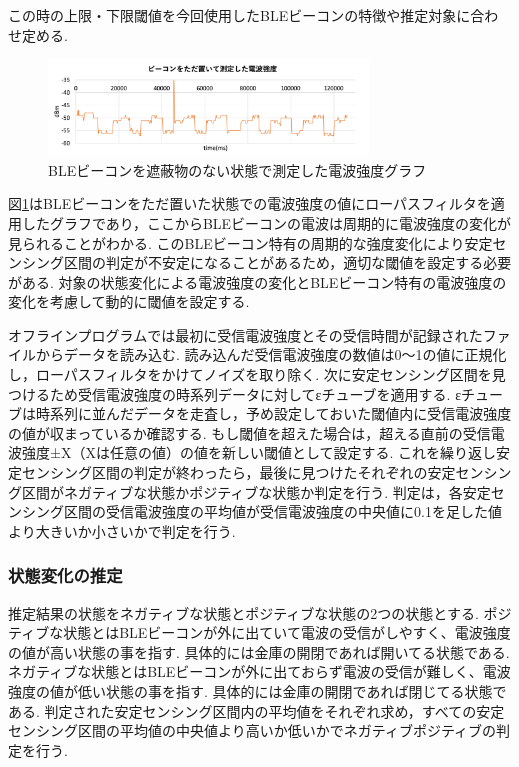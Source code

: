\documentclass[Japanese]{dicomopapers}
\begin{document}
この時の上限・下限閾値を今回使用したBLEビーコンの特徴や推定対象に合わせ定める.

\begin{figure}[b]
    \centering
    \includegraphics[width=8.5cm]{bokoboko.png}
    \caption{BLEビーコンを遮蔽物のない状態で測定した電波強度グラフ}
    \label{nomal-data}
\end{figure}

図\ref{nomal-data}はBLEビーコンをただ置いた状態での電波強度の値にローパスフィルタを適用したグラフであり，ここからBLEビーコンの電波は周期的に電波強度の変化が見られることがわかる.
このBLEビーコン特有の周期的な強度変化により安定センシング区間の判定が不安定になることがあるため，適切な閾値を設定する必要がある.
対象の状態変化による電波強度の変化とBLEビーコン特有の電波強度の変化を考慮して動的に閾値を設定する.

オフラインプログラムでは最初に受信電波強度とその受信時間が記録されたファイルからデータを読み込む.
読み込んだ受信電波強度の数値は0〜1の値に正規化し，ローパスフィルタをかけてノイズを取り除く.
次に安定センシング区間を見つけるため受信電波強度の時系列データに対してεチューブを適用する.
εチューブは時系列に並んだデータを走査し，予め設定しておいた閾値内に受信電波強度の値が収まっているか確認する.
もし閾値を超えた場合は，超える直前の受信電波強度±X（Xは任意の値）の値を新しい閾値として設定する.
これを繰り返し安定センシング区間の判定が終わったら，最後に見つけたそれぞれの安定センシング区間がネガティブな状態かポジティブな状態か判定を行う.
判定は，各安定センシング区間の受信電波強度の平均値が受信電波強度の中央値に0.1を足した値より大きいか小さいかで判定を行う.





\subsubsection{状態変化の推定}
推定結果の状態をネガティブな状態とポジティブな状態の2つの状態とする.
ポジティブな状態とはBLEビーコンが外に出ていて電波の受信がしやすく、電波強度の値が高い状態の事を指す. 具体的には金庫の開閉であれば開いてる状態である.
ネガティブな状態とはBLEビーコンが外に出ておらず電波の受信が難しく、電波強度の値が低い状態の事を指す. 具体的には金庫の開閉であれば閉じてる状態である.
判定された安定センシング区間内の平均値をそれぞれ求め，すべての安定センシング区間の平均値の中央値より高いか低いかでネガティブポジティブの判定を行う.
\end{document}

